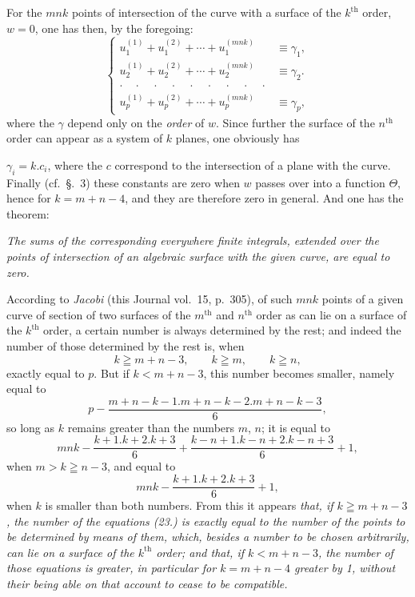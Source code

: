 \documentclass{article}
\begin{document}
For the $mnk$ points of intersection of the curve with a surface of the $k^{\text{th}}$ order, $w=0$, one has then, by the foregoing:
\[
\left\{
\begin{aligned}
u_{1}^{(1)}+u_{1}^{(2)}+\cdots+u_{1}^{(mnk)} &\equiv \gamma_{1},\\
u_{2}^{(1)}+u_{2}^{(2)}+\cdots+u_{2}^{(mnk)} &\equiv \gamma_{2}.\\
\cdot\quad\cdot\quad\cdot\quad\cdot\quad\cdot\quad\cdot\quad\cdot\quad\cdot\quad\cdot &\\
u_{p}^{(1)}+u_{p}^{(2)}+\cdots+u_{p}^{(mnk)} &\equiv \gamma_{p},
\end{aligned}
\right.\tag{23.}
\]
where the $\gamma$ depend only on the \emph{order} of $w$. Since further the surface of the $n^{\text{th}}$ order can appear as a system of $k$ planes, one obviously has

$\gamma_{i}=k.c_{i}$, where the $c$ correspond to the intersection of a plane with the curve. Finally (cf.\ §.~3) these constants are zero when $w$ passes over into a function $\Theta$, hence for $k=m+n-4$, and they are therefore zero in general. And one has the theorem:

\emph{The sums of the corresponding everywhere finite integrals, extended over the points of intersection of an algebraic surface with the given curve, are equal to zero.}

According to \emph{Jacobi} (this Journal vol.\ 15, p.\ 305), of such $mnk$ points of a given curve of section of two surfaces of the $m^{\text{th}}$ and $n^{\text{th}}$ order as can lie on a surface of the $k^{\text{th}}$ order, a certain number is always determined by the rest; and indeed the number of those determined by the rest is, when
\[
k\geqq m+n-3,\qquad k\geqq m,\qquad k\geqq n,
\]
exactly equal to $p$. But if $k<m+n-3$, this number becomes smaller, namely equal to
\[
p-\frac{m+n-k-1.m+n-k-2.m+n-k-3}{6},
\]
so long as $k$ remains greater than the numbers $m$, $n$; it is equal to
\[
mnk-\frac{k+1.k+2.k+3}{6}+\frac{k-n+1.k-n+2.k-n+3}{6}+1,
\]
when $m>k\geqq n-3$, and equal to
\[
mnk-\frac{k+1.k+2.k+3}{6}+1,
\]
when $k$ is smaller than both numbers. From this it appears \emph{that, if $k\geqq m+n-3$, the number of the equations (23.) is exactly equal to the number of the points to be determined by means of them, which, besides a number to be chosen arbitrarily, can lie on a surface of the $k^{\text{th}}$ order; and that, if $k<m+n-3$, the number of those equations is greater, in particular for $k=m+n-4$ greater by 1, without their being able on that account to cease to be compatible.}
\end{document}
